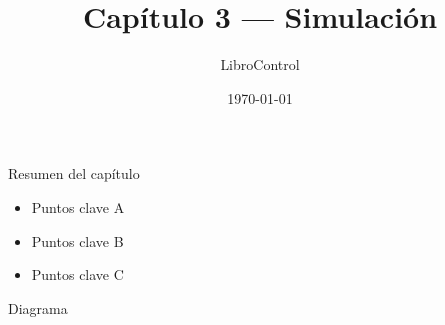 \documentclass{beamer}
\title{Capítulo 3 — Simulación}
\author{LibroControl}
\date{\today}
\begin{document}
\begin{frame}
  \titlepage
\end{frame}

\begin{frame}{Resumen del capítulo}
  \begin{itemize}
    \item Puntos clave A
    \item Puntos clave B
    \item Puntos clave C
  \end{itemize}
\end{frame}

\begin{frame}{Diagrama}
  \centering
\end{frame}
\end{document}
